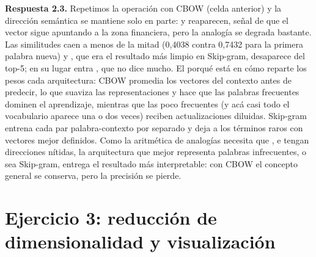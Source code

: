 \textbf{Respuesta 2.3.} Repetimos la operación con CBOW (celda anterior) y la dirección semántica se mantiene solo en parte:  y  reaparecen, señal de que el vector sigue apuntando a la zona financiera, pero la analogía se degrada bastante. Las similitudes caen a menos de la mitad (0,4038 contra 0,7432 para la primera palabra nueva) y , que era el resultado más limpio en Skip-gram, desaparece del top-5; en su lugar entra , que no dice mucho. El porqué está en cómo reparte los pesos cada arquitectura: CBOW promedia los vectores del contexto antes de predecir, lo que suaviza las representaciones y hace que las palabras frecuentes dominen el aprendizaje, mientras que las poco frecuentes (y acá casi todo el vocabulario aparece una o dos veces) reciben actualizaciones diluidas. Skip-gram entrena cada par palabra-contexto por separado y deja a los términos raros con vectores mejor definidos. Como la aritmética de analogías necesita que ,  e  tengan direcciones nítidas, la arquitectura que mejor representa palabras infrecuentes, o sea Skip-gram, entrega el resultado más interpretable: con CBOW el concepto general se conserva, pero la precisión se pierde.

\section{Ejercicio 3: reducción de dimensionalidad y visualización}

